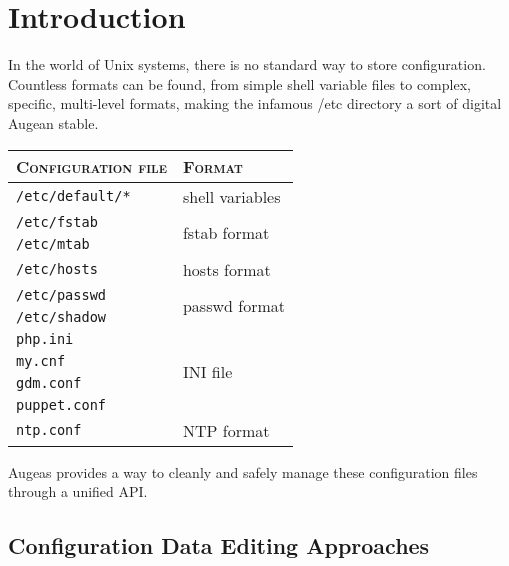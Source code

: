 \cleardoublepage
{}
{}
\chapter*{Introduction}


In the world of Unix systems, there is no standard way to store configuration. Countless formats can be found, from simple shell variable files to complex, specific, multi-level formats, making the infamous /etc directory a sort of digital Augean stable.

\begin{table}
\begin{center}
  \begin{tabular}{l|l}
    \rowcolor{gray!50}
    \textsc{Configuration file} & \textsc{Format} \\
    \hline \hline
    \verb!/etc/default/*! & shell variables \\
    \hline
    \verb!/etc/fstab! & \multirow{2}{*}{fstab format} \\
    \verb!/etc/mtab! &  \\
    \hline
    \verb!/etc/hosts! & hosts format \\
    \hline
    \verb!/etc/passwd! & \multirow{2}{*}{passwd format} \\
    \verb!/etc/shadow! & \\
    \hline
    \verb!php.ini! & \multirow{4}{*}{\textsc{INI} file} \\
    \verb!my.cnf! & \\
    \verb!gdm.conf! &  \\
    \verb!puppet.conf! &  \\
    \hline
    \verb!ntp.conf! & \textsc{NTP} format \\
  \end{tabular}
\end{center}
\end{table}


Augeas provides a way to cleanly and safely manage these configuration files through a unified API.

\section{Configuration Data Editing Approaches}

